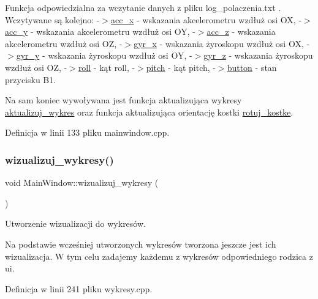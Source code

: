 Funkcja odpowiedzialna za wczytanie danych z pliku log\+\_\+polaczenia.\+txt . Wczytywane są kolejno\+: -\/$>$\hyperlink{}{acc\+\_\+x} -\/ wskazania akcelerometru wzdłuż osi OX, -\/$>$\hyperlink{}{acc\+\_\+y} -\/ wskazania akcelerometru wzdłuż osi OY, -\/$>$\hyperlink{}{acc\+\_\+z} -\/ wskazania akcelerometru wzdłuż osi OZ, -\/$>$\hyperlink{}{gyr\+\_\+x} -\/ wskazania żyroskopu wzdłuż osi OX, -\/$>$\hyperlink{}{gyr\+\_\+y} -\/ wskazania żyroskopu wzdłuż osi OY, -\/$>$\hyperlink{}{gyr\+\_\+z} -\/ wskazania żyroskopu wzdłuż osi OZ, -\/$>$\hyperlink{main_8c_a26fd84d522945b6038221d9e38c7cc39}{roll} -\/ kąt roll, -\/$>$\hyperlink{main_8c_a282e7d4378d4a18a805b8980295ac86c}{pitch} -\/ kąt pitch, -\/$>$\hyperlink{}{button} -\/ stan przycisku B1.

Na sam koniec wywoływana jest funkcja aktualizująca wykresy \hyperlink{class_main_window_ad6eb500a681306e95262d1c55dab9594}{aktualizuj\+\_\+wykres} oraz funkcja aktualizująca orientację kostki \hyperlink{class_main_window_a36136fd65f9fbac0ed55909c48657958}{rotuj\+\_\+kostke}. 

Definicja w linii 133 pliku mainwindow.\+cpp.

\mbox{\label{class_main_window_a1efac5efcb844bf7db47b844f7c6d87e}} 
\subsubsection{\texorpdfstring{wizualizuj\+\_\+wykresy()}{wizualizuj\_wykresy()}}
{\footnotesize\ttfamily void Main\+Window\+::wizualizuj\+\_\+wykresy (\begin{DoxyParamCaption}{ }\end{DoxyParamCaption})}



Utworzenie wizualizacji do wykresów. 

Na podstawie wcześniej utworzonych wykresów tworzona jeszcze jest ich wizualizacja. W tym celu zadajemy każdemu z wykresów odpowiedniego rodzica z ui. 

Definicja w linii 241 pliku wykresy.\+cpp.

\mbox{\label{class_main_window_ad62f0406504e4f43af6fd9ebe5e96a58}} 

